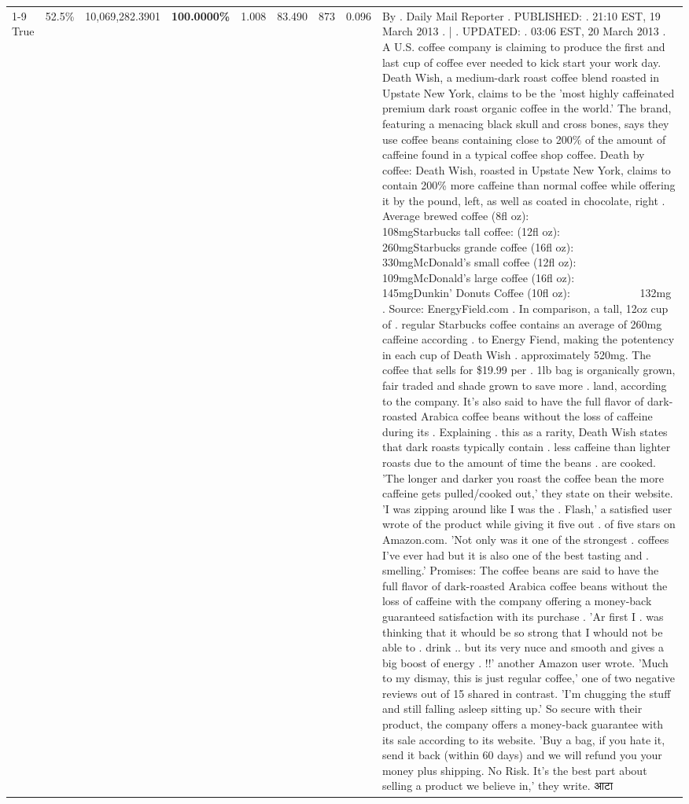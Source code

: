 \begin{table}[H]
{\begin{tabular}{lllrlllll}
\cline{1-9} \cline{2-9}
True & 52.5\% & 10,069,282.3901 & \bfseries \color{red} 100.0000\% & 1.008 & 83.490 & 873 & 0.096 & By . Daily Mail Reporter . PUBLISHED: . 21:10 EST, 19 March 2013 . | . UPDATED: . 03:06 EST, 20 March 2013 . A U.S. coffee company is claiming to produce the first and last cup of coffee ever needed to kick start your work day. Death Wish, a medium-dark roast coffee blend roasted in Upstate New York, claims to be the 'most highly caffeinated premium dark roast organic coffee in the world.' The brand, featuring a menacing black skull and cross bones, says they use coffee beans containing close to 200\% of the amount of caffeine found in a typical coffee shop coffee. Death by coffee: Death Wish, roasted in Upstate New York, claims to contain 200\% more caffeine than normal coffee while offering it by the pound, left, as well as coated in chocolate, right . Average brewed coffee (8fl oz):              108mgStarbucks tall coffee: (12fl oz):                260mgStarbucks grande coffee (16fl oz):         330mgMcDonald's small coffee (12fl oz):           109mgMcDonald's large coffee (16fl oz):           145mgDunkin' Donuts Coffee (10fl oz):             132mg . Source: EnergyField.com . In comparison, a tall, 12oz cup of . regular Starbucks coffee contains an average of 260mg caffeine according . to Energy Fiend, making the potentency in each cup of Death Wish . approximately 520mg. The coffee that sells for \$19.99 per . 1lb bag is organically grown, fair traded and shade grown to save more . land, according to the company. It's also said to have the full flavor of dark-roasted Arabica coffee beans without the loss of caffeine during its . Explaining . this as a rarity, Death Wish states that dark roasts typically contain . less caffeine than lighter roasts due to the amount of time the beans . are cooked. 'The longer and darker you roast the coffee bean the more caffeine gets pulled/cooked out,' they state on their website. 'I was zipping around like I was the . Flash,' a satisfied user wrote of the product while giving it five out . of five stars on Amazon.com. 'Not only was it one of the strongest . coffees I've ever had but it is also one of the best tasting and . smelling.’ Promises: The coffee beans are said to have the full flavor of dark-roasted Arabica coffee beans without the loss of caffeine with the company offering a money-back guaranteed satisfaction with its purchase . 'Ar first I . was thinking that it whould be so strong that I whould not be able to . drink .. but its very nuce and smooth and gives a big boost of energy . !!' another Amazon user wrote. 'Much to my dismay, this is just regular coffee,' one of two negative reviews out of 15 shared in contrast. 'I'm chugging the stuff and still falling asleep sitting up.' So secure with their product, the company offers a money-back guarantee with its sale according to its website. 'Buy a bag, if you hate it, send it back (within 60 days) and we will refund you your money plus shipping. No Risk. It’s the best part about selling a product we believe in,' they write. आटा \\

\end{tabular}}
\end{table}
